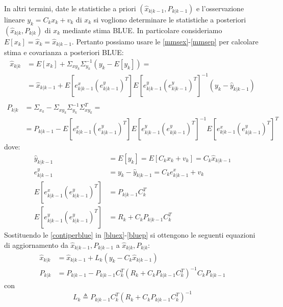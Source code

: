 In altri termini, date le statistiche a priori $(\hat{x}_{k|k-1},P_{k|k-1})$ e l’osservazione lineare $y_k=C_kx_k+v_k$ di $x_k$ si vogliono determinare le statistiche a posteriori $(\hat{x}_{k|k},P_{k|k})$ di $x_k$ mediante stima BLUE. In particolare consideriamo $E[x_k]=\hat{x}_k=\hat{x}_{k|k-1}$. Pertanto possiamo usare le \eqref{mmsex}-\eqref{mmsep} per calcolare stima e covarianza a posteriori BLUE:
\begin{equation}
\label{bluex}
\begin{split}
\hat{x}_{k|k}&=E[x_k] + \Sigma_{xy_k}\Sigma_{y_k}^{-1}(y_k-E[y_k])=\\
&=\hat{x}_{k|k-1}+E[e^x_{k|k-1}(e^y_{k|k-1})^T]E[e^y_{k|k-1}(e^y_{k|k-1})^T]^{-1}(y_k-\hat{y}_{k|k-1})\\
\end{split}
\end{equation}
\begin{equation}
\label{bluep}
\begin{split}
P_{k|k}&= \Sigma_{x_k}- \Sigma_{xy_k}\Sigma_{y_k}^{-1}\Sigma_{xy_k}^T =\\
&=P_{k|k-1}-E[e^x_{k|k-1}(e^y_{k|k-1})^T]E[e^y_{k|k-1}(e^y_{k|k-1})^T]^{-1}E[e^x_{k|k-1}(e^y_{k|k-1})^T]^T
\end{split}
\end{equation}
dove:
\begin{equation}
\label{contiperblue}
\begin{split}
\hat{y}_{k|k-1} &= E[y_k] = E[C_kx_k+v_k] =C_k\hat{x}_{k|k-1}\\
e^y_{k|k-1} &= y_k-\hat{y}_{k|k-1} =C_ke^x_{k|k-1}+v_k\\
E[e^x_{k|k-1}(e^y_{k|k-1})^T] &=P_{k|k-1}C_k^T\\
E[e^y_{k|k-1}(e^y_{k|k-1})^T] &=R_k+C_kP_{k|k-1}C_k^T
\end{split}
\end{equation}
Sostituendo le \eqref{contiperblue} in \eqref{bluex}-\eqref{bluep} si ottengono le seguenti equazioni di aggiornamento da $\hat{x}_{k|k-1},P_{k|k-1}$ a $\hat{x}_{k|k},P_{k|k}$:
\begin{align}
\label{corrx}
\hat{x}_{k|k}&=\hat{x}_{k|k-1}+L_k(y_k-C_k\hat{x}_{k|k-1})\\
\label{corrp}
P_{k|k}&=P_{k|k-1}-P_{k|k-1}C_k^T(R_k+C_kP_{k|k-1}C_k^T)^{-1}C_kP_{k|k-1}
\end{align}
con
\begin{equation}
\label{defl}
L_k \triangleq P_{k|k-1}C_k^T(R_k+C_kP_{k|k-1}C_k^T)^{-1}
\end{equation}

